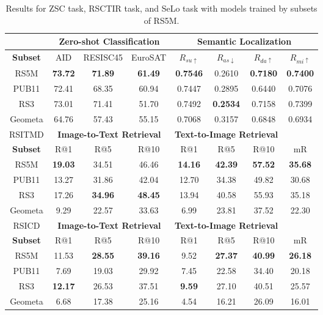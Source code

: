 \documentclass[journal]{IEEEtran}
\begin{document}
\begin{table}[ht]
\caption{Results for ZSC task, RSCTIR task, and SeLo task with models trained by subsets of RS5M.}
\label{table:rs5msubset}
\footnotesize
\setlength{\tabcolsep}{1.75pt}
\begin{tabular}{cccccccc}
\toprule
& \multicolumn{3}{c}{\textbf{Zero-shot Classification}} & \multicolumn{4}{c}{\textbf{Semantic Localization}} \\
\midrule
\textbf{Subset} & AID & RESISC45 & EuroSAT & $R_{su\uparrow}$ & $R_{as\downarrow}$ & $R_{da\uparrow}$ & $R_{mi\uparrow}$ \\
\midrule
 RS5M & \textbf{73.72} &  \textbf{71.89} & \textbf{61.49} & \textbf{0.7546} & 0.2610 &\textbf{0.7180} &\textbf{0.7400} \\
 PUB11 &72.41&68.35&60.94	&0.7447& 0.2895	&	0.6440	& 0.7076\\
 RS3 &73.01&71.41&51.70&0.7492&\textbf{0.2534}&0.7158&0.7399 \\
 Geometa &64.76 &57.43 &55.15 &0.7068 & 0.3157 & 0.6848 & 0.6934\\
\midrule
\midrule
RSITMD & \multicolumn{3}{c}{\textbf{Image-to-Text Retrieval}} & \multicolumn{3}{c}{\textbf{Text-to-Image Retrieval}} & \\
\midrule
\textbf{Subset} &  {R@1} & {R@5} & {R@10} & {R@1} & {R@5} & {R@10} & {mR} \\
 \midrule
  RS5M & \textbf{19.03} & 	34.51 & 	46.46	 & \textbf{14.16}	&  \textbf{42.39} & 	\textbf{57.52}  & 	\textbf{35.68}\\
PUB11 &13.27&	31.86	&42.04	&12.70	&34.38	&49.82& 30.68\\
RS3 &17.26 &	\textbf{34.96}&	\textbf{48.45}	&13.94 &	40.58 &	55.93	&35.18\\
Geometa &9.29	&22.57	&33.63	&6.99	&23.81 &	37.52	&22.30\\
\midrule
RSICD & \multicolumn{3}{c}{\textbf{Image-to-Text Retrieval}} & \multicolumn{3}{c}{\textbf{Text-to-Image Retrieval}} & \\
\midrule
\textbf{Subset} &  {R@1} & {R@5} & {R@10} & {R@1} & {R@5} & {R@10} & {mR} \\
 \midrule
  RS5M & 11.53  &	\textbf{28.55} 	& \textbf{39.16}  & 	9.52  & 	\textbf{27.37} 	& \textbf{40.99}  &	\textbf{26.18} \\
PUB11 &7.69&	19.03	&29.92 &	7.45&	22.58&	34.40& 	20.18\\
RS3 &\textbf{12.17}	&26.53&	37.51	&\textbf{9.59}	&27.10 &	40.51 &	25.57\\
Geometa &6.68 &	17.38 &	25.16 &	4.54 &	16.21	&26.09	&16.01\\
\bottomrule
\end{tabular}
\end{table}
\end{document}
